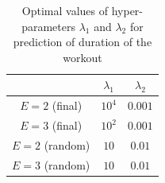 \documentclass{acm_proc_article-sp}
\begin{document}
\begin{table}[H]
\centering
\begin{tabular}{|c|c|c|} \hline
& $\lambda_1$ & $\lambda_2$ \\ \hline
$E = 2$ (final) & $10^4$ & $0.001$ \\ \hline
$E = 3$ (final) & $10^2$ & $0.001$ \\ \hline
$E = 2$ (random) & $10$ & $0.01$ \\ \hline
$E = 3$ (random) & $10$ & $0.01$ \\ \hline
\end{tabular}
\caption{Optimal values of hyper-parameters $\lambda_1$ and $\lambda_2$ for prediction of duration of the workout}
\label{tableDurationHyperparams}
\end{table}

\end{document}
